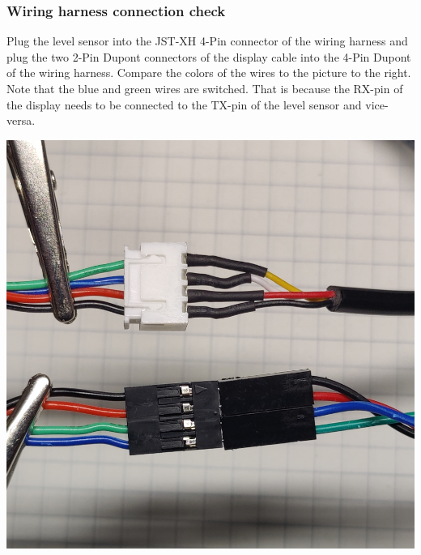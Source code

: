 \documentclass[]{article}
\begin{document}
\subsubsection{Wiring harness connection check}
\begin{minipage}[t]{0.5\linewidth}
	\vspace{0pt}
	Plug the level sensor into the JST-XH 4-Pin connector of the wiring harness and plug the two 2-Pin Dupont connectors of the display cable into the 4-Pin Dupont of the wiring harness. Compare the colors of the wires to the picture to the right. Note that the blue and green wires are switched. That is because the RX-pin of the display needs to be connected to the TX-pin of the level sensor and vice-versa.
\end{minipage}
\hfill
\begin{minipage}[t]{0.4\linewidth}
	\vspace{0pt}
	\includegraphics[width=\linewidth]{images/02_wiring/06_wiretree_plugs_connected.jpg}
\end{minipage}
\end{document}
